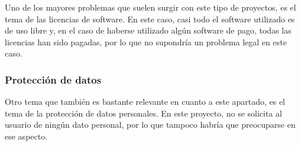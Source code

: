 Uno de los mayores problemas que suelen surgir con este tipo de proyectos, es el tema de las licencias de software.
En este caso, casi todo el software utilizado es de uso libre y, en el caso de haberse utilizado algún software de pago, todas las licencias han sido pagadas, por lo que no supondría un problema legal en este caso.

\subsubsection{Protección de datos}

Otro tema que también es bastante relevante en cuanto a este apartado, es el tema de la protección de datos personales.
En este proyecto, no se solicita al usuario de ningún dato personal, por lo que tampoco habría que preocuparse en ese aspecto.
